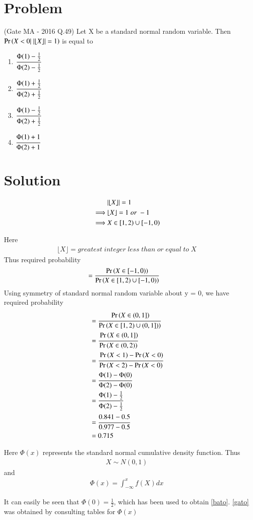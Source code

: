 \documentclass[journal,12pt,twocolumn]{IEEEtran}
\begin{document}
\section{Problem}
(Gate MA - 2016 Q.49) Let X be a standard normal random variable. Then $\Pr\left(X < 0 |\;\vert\lfloor X\rfloor\vert = 1\right)$ is equal to
\begin{enumerate}[label = \alph*)]
    \item $\cfrac{\Phi(1) - \frac{1}{2}}{\Phi(2) - \frac{1}{2}}$
    \item $\cfrac{\Phi(1) + \frac{1}{2}}{\Phi(2) + \frac{1}{2}}$
    \item $\cfrac{\Phi(1) - \frac{1}{2}}{\Phi(2) + \frac{1}{2}}$
    \item $\cfrac{\Phi(1) + 1}{\Phi(2) + 1}$
\end{enumerate}
\section{Solution}
\begin{align}
    &\vert\lfloor X\rfloor\vert = 1\\
    \implies &\lfloor X\rfloor = 1\; or\; -1\\
    \implies &X \in [1, 2) \cup [-1, 0)
\end{align}

Here 
\begin{align*}
    \lfloor X\rfloor = greatest\; integer\; less\; than\; or\; equal\; to\; X
\end{align*}
Thus required probability
\begin{align}
    &= \frac{\Pr\left(X\in [-1,0)\right)}{\Pr\left(X \in [1, 2) \cup [-1, 0)\right)}
\end{align} 
Using symmetry of standard normal random variable about y = 0, we have required probability 
\begin{align}
    &= \cfrac{\Pr\left(X\in (0,1]\right)}{\Pr\left(X \in [1, 2) \cup (0, 1])\right)}\\
    &= \cfrac{\Pr\left(X \in (0, 1]\right)}{\Pr\left(X \in (0, 2)\right)}\\
    &= \cfrac{\Pr\left(X < 1\right) - \Pr\left(X < 0\right)}{\Pr\left(X < 2\right) - \Pr\left(X < 0\right)}\\
    &= \cfrac{\Phi(1) - \Phi(0)}{\Phi(2) - \Phi(0)}\\
    &= \cfrac{\Phi(1) - \frac{1}{2}}{\Phi(2) - \frac{1}{2}}\label{bato}\\
    &= \cfrac{0.841 - 0.5}{0.977 - 0.5}\label{gato}\\
    &= 0.715
\end{align}

Here $\Phi(x)$ represents the standard normal cumulative density function. Thus 
\begin{align}
    X \sim N(0,1)
\end{align}
and 
\begin{align}
    \Phi(x) = \int_{-\infty}^x f(X)dx
\end{align}

It can easily be seen that $\Phi(0) = \frac{1}{2}$, which has been used to obtain \eqref{bato}.
\eqref{gato} was obtained by consulting tables for $\Phi(x)$
\end{document}
